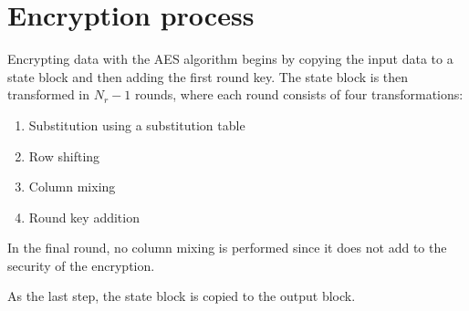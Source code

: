 \documentclass[report.tex]{subfiles}
\begin{document}
\section{Encryption process} \label{sec:encryption process}
Encrypting data with the AES algorithm begins by copying the input data to a state block and then adding the first round key. The state block is then transformed in $N_r-1$ rounds, where each round consists of four transformations:
\begin{enumerate}
\item Substitution using a substitution table
\item Row shifting
\item Column mixing
\item Round key addition
\end{enumerate}
In the final round, no column mixing is performed since it does not add to the security of the encryption.

As the last step, the state block is copied to the output block.

\clearpage
\end{document}

